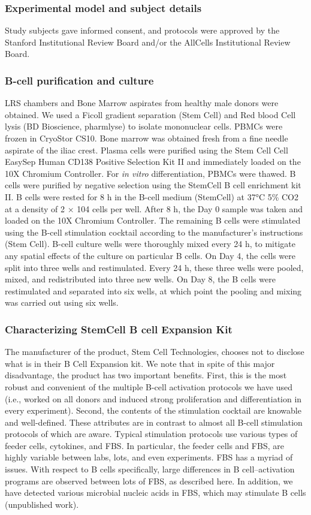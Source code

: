 \subsubsection{Experimental model and subject details}
Study subjects gave informed consent, and protocols were approved by the Stanford Institutional Review Board and/or the AllCells Institutional Review Board.
\subsubsection{B-cell purification and culture}
LRS chambers and Bone Marrow aspirates from healthy male donors were obtained. We used a Ficoll gradient separation (Stem Cell) and Red blood Cell lysis (BD Bioscience, pharmlyse) to isolate mononuclear cells. PBMCs were frozen in CryoStor CS10. Bone marrow was obtained fresh from a fine needle aspirate of the iliac crest. Plasma cells were purified using the Stem Cell Cell EasySep Human CD138 Positive Selection Kit II and immediately loaded on the 10X Chromium Controller. For \textit{in vitro} differentiation, PBMCs were thawed. B cells were purified by negative selection using the StemCell B cell enrichment kit II. B cells were rested for 8 h in the B-cell medium (StemCell) at 37°C 5\% CO2 at a density of 2 × 104 cells per well. After 8 h, the Day 0 sample was taken and loaded on the 10X Chromium Controller. The remaining B cells were stimulated using the B-cell stimulation cocktail according to the manufacturer’s instructions (Stem Cell). B-cell culture wells were thoroughly mixed every 24 h, to mitigate any spatial effects of the culture on particular B cells. On Day 4, the cells were split into three wells and restimulated. Every 24 h, these three wells were pooled, mixed, and redistributed into three new wells. On Day 8, the B cells were restimulated and separated into six wells, at which point the pooling and mixing was carried out using six wells.
\subsubsection{Characterizing StemCell B cell Expansion Kit}
The manufacturer of the product, Stem Cell Technologies, chooses not to disclose what is in their B Cell Expansion kit. We note that in spite of this major disadvantage, the product has two important benefits. First, this is the most robust and convenient of the multiple B-cell activation protocols we have used (i.e., worked on all donors and induced strong proliferation and differentiation in every experiment). Second, the contents of the stimulation cocktail are knowable and well-defined. These attributes are in contrast to almost all B-cell stimulation protocols of which are aware. Typical stimulation protocols use various types of feeder cells, cytokines, and FBS. In particular, the feeder cells and FBS, are highly variable between labs, lots, and even experiments. FBS has a myriad of issues\cite{gstraunthaler_plea_2013}. With respect to B cells specifically, large differences in B cell–activation programs are observed between lots of FBS, as described here\cite{haniuda_induced_2019}. In addition, we have detected various microbial nucleic acids in FBS, which may stimulate B cells (unpublished work).

